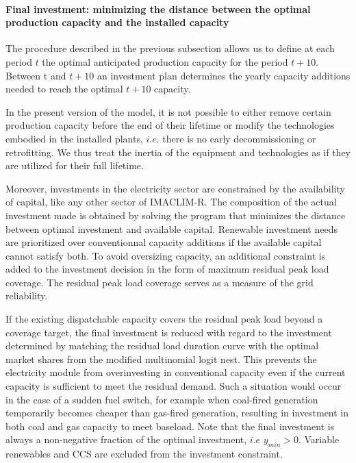 
\paragraph{Final investment: minimizing the distance between the optimal production capacity and the installed capacity}

The procedure described in the previous subsection allows us to define at each period $t$  the optimal anticipated production capacity for the period $t+10$. Between t and $t+10$ an investment plan determines the yearly capacity additions needed to reach the optimal $t+10$ capacity.

In the present version of the model, it is not possible to either remove certain production capacity before the end of their lifetime or modify the technologies embodied in the installed plants, $i.e.$ there is no early decommissioning or retrofitting. We thus treat the inertia of the equipment and technologies as if they are utilized for their full lifetime.

Moreover, investments in the electricity sector are constrained by the availability of capital, like any other sector of IMACLIM-R. The composition of the actual investment made is obtained by solving the program that minimizes the distance between optimal investment and available capital. Renewable investment needs are prioritized over conventionnal capacity additions if the available capital cannot satisfy both.
To avoid oversizing capacity, an additional constraint is added to the investment decision in the form of maximum residual peak load coverage. The residual peak load coverage serves as a measure of the grid reliability.

If the existing dispatchable capacity covers the residual peak load beyond a coverage target, the final investment is reduced with regard to the investment determined by matching the residual load duration curve with the optimal market shares from the modified multinomial logit nest. This prevents the electricity module from overinvesting in conventional capacity even if the current capacity is sufficient to meet the residual demand. Such a situation would occur in the case of a sudden fuel switch, for example when coal-fired generation temporarily becomes cheaper than gas-fired generation, resulting in investment in both coal and gas capacity to meet baseload. Note that the final investment is always a non-negative fraction of the optimal investment, $i.e$ $y_{min} > 0$. Variable renewables and CCS are excluded from the investment constraint.

